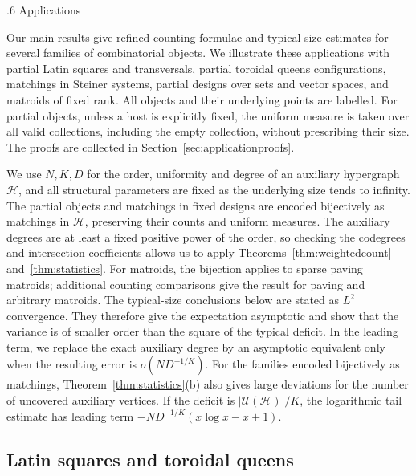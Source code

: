 \documentclass[11pt,reqno]{amsart}
\makeatletter
\numberwithin{equation}{section}
\renewcommand{\section}{\@startsection{section}{1}%
    \z@{1.3\linespacing\@plus.5\linespacing\@minus.2\linespacing}%
    {.6\linespacing}%
    {\normalfont\scshape\centering}}
\theoremstyle{plain}
\theoremstyle{definition}
\newcommand{\calH}{\mathcal{H}}
\newcommand{\calU}{\mathcal U}
\makeatother
\begin{document}

\section{Applications}\label{sec:applications}

Our main results give refined counting formulae and typical-size estimates for several families of combinatorial objects.
We illustrate these applications with partial Latin squares and transversals, partial toroidal queens configurations, matchings in Steiner systems, partial designs over sets and vector spaces, and matroids of fixed rank.
All objects and their underlying points are labelled.
For partial objects, unless a host is explicitly fixed, the uniform measure is taken over all valid collections, including the empty collection, without prescribing their size.
The proofs are collected in Section~\ref{sec:applicationproofs}.

We use $N,K,D$ for the order, uniformity and degree of an auxiliary hypergraph $\calH$, and all structural parameters are fixed as the underlying size tends to infinity.
The partial objects and matchings in fixed designs are encoded bijectively as matchings in $\calH$, preserving their counts and uniform measures.
The auxiliary degrees are at least a fixed positive power of the order, so checking the codegrees and intersection coefficients allows us to apply Theorems~\ref{thm:weightedcount} and~\ref{thm:statistics}.
For matroids, the bijection applies to sparse paving matroids; additional counting comparisons give the result for paving and arbitrary matroids.
The typical-size conclusions below are stated as $L^2$ convergence.
They therefore give the expectation asymptotic and show that the variance is of smaller order than the square of the typical deficit.
In the leading term, we replace the exact auxiliary degree by an asymptotic equivalent only when the resulting error is $o(ND^{-1/K})$.
For the families encoded bijectively as matchings, Theorem~\ref{thm:statistics}(b) also gives large deviations for the number of uncovered auxiliary vertices.
If the deficit is $|\calU(\calH)|/K$, the logarithmic tail estimate has leading term $-ND^{-1/K}(x\log x-x+1)$.


\subsection{Latin squares and toroidal queens}\label{subsec:latinqueens}
\end{document}
